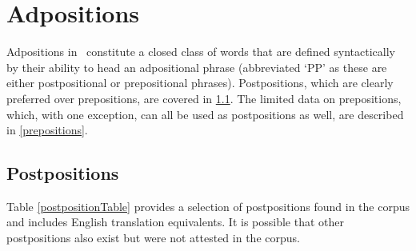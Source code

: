 \section{Adpositions}\label{adpositions}
Adpositions in \PS\ constitute a closed class of words that are defined syntactically by their ability to head an adpositional phrase (abbreviated ‘PP’ as these are either postpositional or prepositional phrases). 
Postpositions, which are clearly preferred over prepositions, are covered in \SEC\ref{postpositions}. The limited data on prepositions, which, with one exception, can all be used as postpositions as well, are described in \SEC\ref{prepositions}. 

\subsection{Postpositions}\label{postpositions}
Table \vref{postpositionTable} provides a selection of postpositions found in the corpus and includes English translation equivalents. %
It is possible that other postpositions also exist but were not attested in the corpus. %
